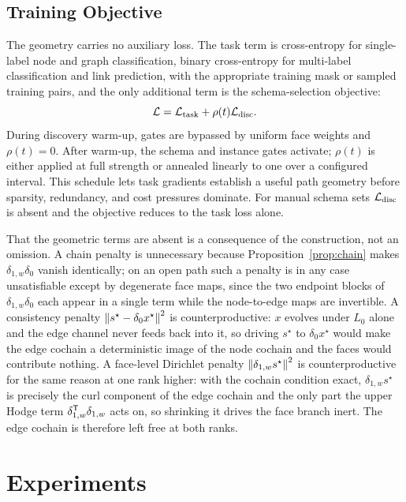 \subsection{Training Objective}

The geometry carries no auxiliary loss.  The task term is cross-entropy for single-label node and
graph classification, binary cross-entropy for multi-label classification and link prediction, with
the appropriate training mask or sampled training pairs, and the only additional term is the
\ampss{} schema-selection objective:
\begin{equation}
  \mathcal{L}
  =\mathcal{L}_{\mathrm{task}}
   +\rho(t)\mathcal{L}_{\mathrm{disc}} .
  \label{eq:loss}
\end{equation}
During discovery warm-up, gates are bypassed by uniform face weights and \(\rho(t)=0\).  After
warm-up, the schema and instance gates activate; \(\rho(t)\) is either applied at full strength or
annealed linearly to one over a configured interval.  This schedule lets task gradients establish a
useful path geometry before sparsity, redundancy, and cost pressures dominate.  For manual schema
sets \(\mathcal{L}_{\mathrm{disc}}\) is absent and the objective reduces to the task loss alone.

That the geometric terms are absent is a consequence of the construction, not an omission.  A chain
penalty is unnecessary because Proposition~\ref{prop:chain} makes \(\delta_{1,w}\delta_0\) vanish
identically; on an open path such a penalty is in any case unsatisfiable except by degenerate face
maps, since the two endpoint blocks of \(\delta_{1,w}\delta_0\) each appear in a single term while the
node-to-edge maps are invertible.  A consistency penalty \(\left\lVert s^\star-\delta_0x^\star\right\rVert^2\) is
counterproductive: \(x\) evolves under \(L_0\) alone and the edge channel never feeds back into it, so
driving \(s^\star\) to \(\delta_0x^\star\) would make the edge cochain a deterministic image of the
node cochain and the faces would contribute nothing.  A face-level Dirichlet penalty
\(\left\lVert \delta_{1,w}s^\star\right\rVert^2\) is counterproductive for the same reason at one rank higher: with the
cochain condition exact, \(\delta_{1,w}s^\star\) is precisely the curl component of the edge cochain
and the only part the upper Hodge term \(\delta_{1,w}^{\mathsf{T}}\delta_{1,w}\) acts on, so shrinking
it drives the face branch inert.  The edge cochain is therefore left free at both ranks.


\section{Experiments}
\label{sec:experiments}

